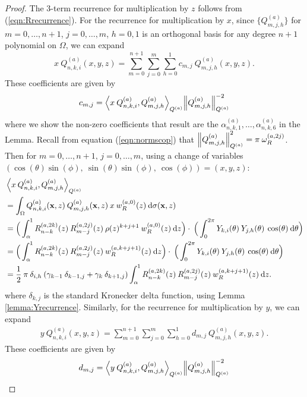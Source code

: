 \documentclass[11pt, oneside]{article}   	%
\newcommand{\half}{\frac{1}{2}}
\newcommand{\genjac}{R}
\newcommand{\genjacnmk}{\genjac_{n-k}}
\newcommand{\genjacmmj}{\genjac_{m-j}}
\newcommand{\genjacw}{w_\genjac}
\newcommand{\normgenjac}{\omega_\genjac}
\newcommand{\scop}{Q}
\newcommand{\scopnki}{\scop_{n,k,i}}
\newcommand{\scopmjh}{\scop_{m,j,h}}
\newcommand{\scopa}{\scop^{(a)}}
\newcommand{\scopnkia}{\scopnki^{(a)}}
\newcommand{\scopmjha}{\scopmjh^{(a)}}
\newcommand{\xvec}{\mathbf{x}}
\newcommand{\ch}{Y}
\newcommand{\chki}{\ch_{k,i}}
\newcommand{\chjh}{\ch_{j,h}}
\newcommand{\alphaa}{\alpha^{(a)}}
\begin{document}
\begin{proof}
The 3-term recurrence for multiplication by $z$ follows from (\ref{eqn:Rrecurrence}). For the recurrence for multiplication by $x$, since $\{\scopmjha\}$ for $m = 0,\dots,n+1$, $j = 0,\dots,m$, $h = 0,1$ is an orthogonal basis for any degree $n+1$ polynomial on $\Omega$, we can expand 
$$
x \: \scopnkia(x,y,z) = \sum_{m=0}^{n+1} \sum_{j=0}^m \sum_{h=0}^1 c_{m,j} \: \scopmjha(x,y,z).
$$
These coefficients are given by
\begin{align*}
	c_{m,j} = {\ip< x \: \scopnkia, \scopmjha >_{\scopa}}{\norm{\scopmjha}^{-2}_{\scopa}}
\end{align*}
where we show the non-zero coefficients that result are the $\alphaa_{n,k,1},\dots,\alphaa_{n,k,6}$ in the Lemma.
Recall from equation (\ref{eqn:normscop}) that $\norm{\scopmjha}_{\scopa}^2 = \pi \: \normgenjac^{(a,2j)}$. Then for $m = 0,\dots,n+1$, $j = 0,\dots,m$, using a change of variables $(\cos(\theta) \sin(\phi), \: \sin(\theta)\sin(\phi), \: \cos(\phi)) = (x, y, z)$:
\begin{align*}
	&\ip<x \: \scopnkia, \scopmjha>_{\scopa} \\
	&= \int_\Omega \scopnkia(\xvec,z) \: \scopmjha(\xvec,z) \: x \: \genjacw^{(a,0)}(z) \: \D\sigma(\xvec, z) \\
	&= \Big( \int^1_\alpha \genjacnmk^{(a, 2k)}(z) \: \genjacmmj^{(a, 2j)}(z) \: \rho(z)^{k+j+1} \: \genjacw^{(a, 0)}(z) \: \D z \Big) \cdot \: \Big( \int_0^{2\pi} \chki(\theta) \: \chjh(\theta) \: \cos(\theta) \: \D \theta \Big) \\
	&= \Big( \int^1_\alpha \genjacnmk^{(a, 2k)}(z) \: \genjacmmj^{(a, 2j)}(z) \: \genjacw^{(a, k + j + 1)}(z) \: \D z \Big) \cdot \: \Big( \int_0^{2\pi} \chki(\theta) \: \chjh(\theta) \: \cos(\theta) \: \D \theta \Big) \\
	&= \half \: \pi \: \delta_{i,h} \: (\gamma_{k-1} \: \delta_{k-1, j} + \gamma_{k} \: \delta_{k+1, j})  \int^1_\alpha \genjacnmk^{(a, 2k)}(z) \: \genjacmmj^{(a, 2j)}(z) \: \genjacw^{(a, k + j + 1)}(z) \: \D z.
\end{align*}
where $\delta_{k, j}$ is the standard Kronecker delta function, using Lemma \ref{lemma:Yrecurrence}. Similarly, for the recurrence for multiplication by $y$, we can expand 
\begin{align*}
	y \: \scopnkia(x,y,z) = \sum_{m=0}^{n+1} \sum_{j=0}^m \sum_{h=0}^1 d_{m,j} \: \scopmjha(x,y,z).
\end{align*}
These coefficients are given by
\begin{align*}
	d_{m,j} = {\ip< y \: \scopnkia, \scopmjha >_{\scopa}}{\norm{\scopmjha}^{-2}_{\scopa}}

\end{align*}
\end{proof}
\end{document}
